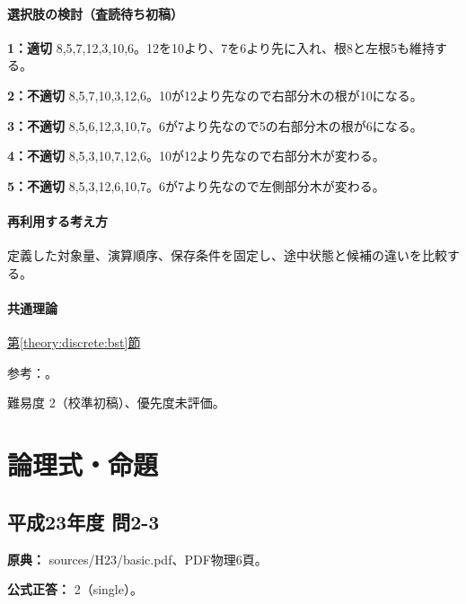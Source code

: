 \paragraph{選択肢の検討（査読待ち初稿）}\mbox{}\par

\noindent\textbf{1：適切} 8,5,7,12,3,10,6。12を10より、7を6より先に入れ、根8と左根5も維持する。\par

\noindent\textbf{2：不適切} 8,5,7,10,3,12,6。10が12より先なので右部分木の根が10になる。\par

\noindent\textbf{3：不適切} 8,5,6,12,3,10,7。6が7より先なので5の右部分木の根が6になる。\par

\noindent\textbf{4：不適切} 8,5,3,10,7,12,6。10が12より先なので右部分木が変わる。\par

\noindent\textbf{5：不適切} 8,5,3,12,6,10,7。6が7より先なので左側部分木が変わる。\par

\paragraph{再利用する考え方} 定義した対象量、演算順序、保存条件を固定し、途中状態と候補の違いを比較する。

\paragraph{共通理論} \hyperref[theory:discrete:bst]{第\ref*{theory:discrete:bst}節}

\par 参考：\cite{princeton_bst}。

\par 難易度 2（校準初稿）、優先度未評価。

\section{論理式・命題}

\subsection{平成23年度 問2-3}
\label{q:h23-reg-basic-2-3}

\noindent\textbf{原典：} sources/H23/basic.pdf、PDF物理6頁。

\textbf{公式正答：} 2（single）。

